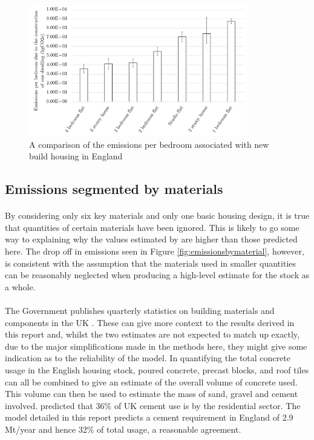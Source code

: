 \documentclass[12pt]{article}
\begin{document}
\begin{figure}[!ht]
    \centering
    \includegraphics[width=0.85\textwidth]{Figures/Per_bedroom.png}
    \caption{A comparison of the emissions per bedroom associated with new build housing in England}
    \label{fig:bybedroom}
\end{figure}

\subsection{Emissions segmented by materials}

\paragraph{}
By considering only six key materials and only one basic housing design, it is true that quantities of certain materials have been ignored. This is likely to go some way to explaining why the values estimated by \citet{Suzuki1995-ve} are higher than those predicted here. The drop off in emissions seen in Figure \ref{fig:emissionsbymaterial}, however, is consistent with the assumption that the materials used in smaller quantities can be reasonably neglected when producing a high-level estimate for the stock as a whole.

\paragraph{}
The Government publishes quarterly statistics on building materials and components in the UK \citep{Department_for_Business_Energy_Industrial_Strategy2019-va}. These can give more context to the results derived in this report and, whilst the two estimates are not expected to match up exactly, due to the major simplifications made in the methods here, they might give some indication as to the reliability of the model. In quantifying the total concrete usage in the English housing stock, poured concrete, precast blocks, and roof tiles can all be combined to give an estimate of the overall volume of concrete used. This volume can then be used to estimate the mass of sand, gravel and cement involved. \citet{Shanks2019-nu} predicted that 36\% of UK cement use is by the residential sector. The model detailed in this report predicts a cement requirement in England of 2.9 Mt/year and hence 32\% of total usage, a reasonable agreement.
\end{document}
